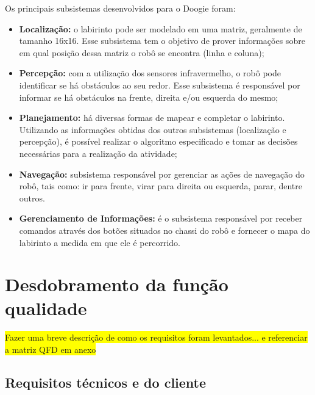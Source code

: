 Os principais subsistemas desenvolvidos para o Doogie foram:
\begin{itemize}
	\item \textbf{Localização:} o labirinto pode ser modelado em uma matriz, geralmente de tamanho 16x16. Esse subsistema tem o objetivo de prover informações sobre em qual posição dessa matriz o robô se encontra (linha e coluna);
	
	\item \textbf{Percepção:} com a utilização dos sensores infravermelho, o robô pode identificar se há obstáculos ao seu redor. Esse subsistema é responsável por informar se há obstáculos na frente, direita e/ou esquerda do mesmo;
	
	\item \textbf{Planejamento:} há diversas formas de mapear e completar o labirinto. Utilizando as informações obtidas dos outros subsistemas (localização e percepção), é possível realizar o algoritmo especificado e tomar as decisões necessárias para a realização da atividade;
	
	\item \textbf{Navegação:} subsistema responsável por gerenciar as ações de navegação do robô, tais como: ir para frente, virar para direita ou esquerda, parar, dentre outros.
	
	\item \textbf{Gerenciamento de Informações:} é o subsistema responsável por receber comandos através dos botões situados no chassi do robô e fornecer o mapa do labirinto a medida em que ele é percorrido. 
\end{itemize}

\section{Desdobramento da função qualidade}
\label{sec:qfd}
\colorbox{yellow}{Fazer uma breve descrição de como os requisitos foram levantados... e referenciar a matriz QFD em anexo}

\subsection{Requisitos técnicos e do cliente}
\label{ssec:requisitos_tecnicos_e_do_cliente}

